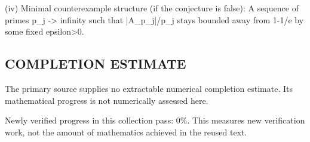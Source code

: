 (iv) Minimal counterexample structure (if the conjecture is false):
A sequence of primes p_j -> infinity such that |A_{p_j}|/p_j stays bounded away from 1-1/e by some fixed epsilon>0.




\subsection*{COMPLETION ESTIMATE}
The primary source supplies no extractable numerical completion estimate. Its mathematical progress is not numerically assessed here.

Newly verified progress in this collection pass: $0\%$. This measures new verification work, not the amount of mathematics achieved in the reused text.
